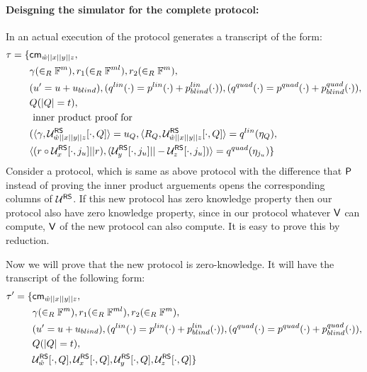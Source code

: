 \paragraph{Deisgning the simulator for the complete protocol: } In an actual execution of the protocol generates a transcript of the form:
\begin{align*}
\tau = \{ 
& \mathsf{cm}_{\hat{w}||x||y||z},\\
& \gamma(\in_R \mathbb{F}^{m}), r_1(\in_R \mathbb{F}^{ml}), r_2(\in_R \mathbb{F}^m), \\ 
& (u' = u+u_{blind}), (q^{lin}(\cdot) = p^{lin}(\cdot)+p^{lin}_{blind}(\cdot)), (q^{quad}(\cdot) = p^{quad}(\cdot) + p^{quad}_{blind}(\cdot)),\\
& Q (|Q|=t),\\
& \text{ inner product proof for } \\
& (\langle \gamma,\mathcal{U}^{\mathsf{RS}}_{\hat{w}||x||y||z}[\cdot, Q]\rangle = u_Q, \langle R_Q,\mathcal{U}^{\mathsf{RS}}_{\hat{w}||x||y||z}[\cdot, Q]\rangle=q^{lin}(\eta_Q),\\
& \langle (r\circ \mathcal{U}^{\mathsf{RS}}_x[\cdot,j_u]||r),(\mathcal{U}^{\mathsf{RS}}_y[\cdot,j_u]||-\mathcal{U}^{\mathsf{RS}}_z[\cdot,j_u])\rangle = q^{quad}(\eta_{j_u})
\}
\end{align*}
Consider a protocol, which is same as above protocol with the difference that $\mathsf{P}$ instead of proving the inner product arguements opens the corresponding columns of $\mathcal{U}^{\mathsf{RS}}$. If this new protocol has zero knowledge property then our protocol also have zero knowledge property, since in our protocol whatever $\mathsf{V}$ can compute, $\mathsf{V}$ of the new protocol can also compute. It is easy to prove this by reduction.

Now we will prove that the new protocol is zero-knowledge. It will have the transcript of the following form:
\begin{align*}
\tau' = \{
& \mathsf{cm}_{\hat{w}||x||y||z},\\
& \gamma(\in_R \mathbb{F}^{m}), r_1(\in_R \mathbb{F}^{ml}), r_2(\in_R \mathbb{F}^m), \\ 
& (u' = u+u_{blind}), (q^{lin}(\cdot) = p^{lin}(\cdot)+p^{lin}_{blind}(\cdot)), (q^{quad}(\cdot) = p^{quad}(\cdot) + p^{quad}_{blind}(\cdot)),\\
& Q (|Q|=t),\\
& \mathcal{U}^{\mathsf{RS}}_{\hat{w}}[\cdot, Q], \mathcal{U}^{\mathsf{RS}}_{x}[\cdot, Q], \mathcal{U}^{\mathsf{RS}}_{y}[\cdot, Q], \mathcal{U}^{\mathsf{RS}}_{z}[\cdot, Q]
\}
\end{align*}

